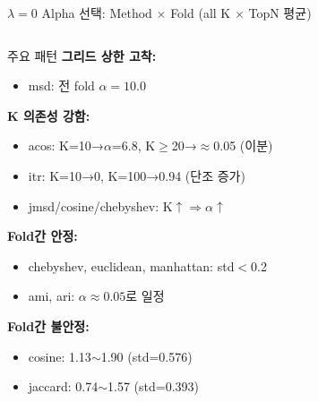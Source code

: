 \documentclass[aspectratio=169,10pt]{beamer}
\begin{document}
\begin{frame}[shrink=8]{$\lambda=0$ Alpha 선택: Method $\times$ Fold \textnormal{\small(all K $\times$ TopN 평균)}}
\begin{columns}[T]
			\begin{alertblock}{주요 패턴}
				\small
				\textbf{그리드 상한 고착:}
				\begin{itemize}\setlength{\itemsep}{1pt}
					\item msd: 전 fold $\alpha=10.0$
				\end{itemize}
				\textbf{K 의존성 강함:}
				\begin{itemize}\setlength{\itemsep}{1pt}
					\item acos: K=10→$\alpha$=6.8, K$\geq$20→$\approx$0.05 (이분)
					\item itr: K=10→0, K=100→0.94 (단조 증가)
					\item jmsd/cosine/chebyshev: K$\uparrow \Rightarrow \alpha\uparrow$
				\end{itemize}
				\textbf{Fold간 안정:}
				\begin{itemize}\setlength{\itemsep}{1pt}
					\item chebyshev, euclidean, manhattan: std$<$0.2
					\item ami, ari: $\alpha \approx 0.05$로 일정
				\end{itemize}
				\textbf{Fold간 불안정:}
				\begin{itemize}\setlength{\itemsep}{1pt}
					\item cosine: 1.13$\sim$1.90 (std=0.576)
					\item jaccard: 0.74$\sim$1.57 (std=0.393)
				\end{itemize}
			\end{alertblock}
	\end{columns}
\end{frame}
\end{document}

